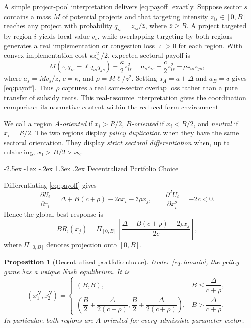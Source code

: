\documentclass[12pt]{article}
\makeatletter
\newtheorem{proposition}{Proposition}
\renewcommand\section{\@startsection{section}{1}{\z@}%
  {-2.5ex \@plus -1ex \@minus -.2ex}%
  {1.3ex \@plus .2ex}%
  {\centering\normalfont\fontsize{14}{16}\selectfont\bfseries}}
\makeatother
\begin{document}
A simple project-pool interpretation delivers \eqref{eq:payoff} exactly. Suppose sector $s$ contains a mass $M$ of potential projects and that targeting intensity $z_{is}\in[0,B]$ reaches any project with probability $q_{is}=z_{is}/\bar z$, where $\bar z\ge B$. A project targeted by region $i$ yields local value $v_s$, while overlapping targeting by both regions generates a real implementation or congestion loss $\ell>0$ for each region. With convex implementation cost $\kappa z_{is}^2/2$, expected sectoral payoff is
\[
M\left(v_s q_{is}-\ell q_{is}q_{js}\right)-\frac{\kappa}{2}z_{is}^2
=a_s z_{is}-\frac{c}{2}z_{is}^2-\rho z_{is}z_{js},
\]
where $a_s=Mv_s/\bar z$, $c=\kappa$, and $\rho=M\ell/\bar z^2$. Setting $a_A=a+\Delta$ and $a_B=a$ gives \eqref{eq:payoff}. Thus $\rho$ captures a real same-sector overlap loss rather than a pure transfer of subsidy rents. This real-resource interpretation gives the coordination comparison its normative content within the reduced-form environment.

We call a region \emph{$A$-oriented} if $x_i>B/2$, \emph{$B$-oriented} if $x_i<B/2$, and \emph{neutral} if $x_i=B/2$. The two regions display \emph{policy duplication} when they have the same sectoral orientation. They display \emph{strict sectoral differentiation} when, up to relabeling, $x_1>B/2>x_2$.

\section{Decentralized Portfolio Choice}

Differentiating \eqref{eq:payoff} gives
\begin{equation}
\frac{\partial U_i}{\partial x_i}
=\Delta+B(c+\rho)-2cx_i-2\rho x_j,
\qquad
\frac{\partial^2 U_i}{\partial x_i^2}=-2c<0.
\label{eq:foc}
\end{equation}
Hence the global best response is
\begin{equation}
BR_i(x_j)=
\Pi_{[0,B]}
\left[
\frac{\Delta+B(c+\rho)-2\rho x_j}{2c}
\right],
\label{eq:br}
\end{equation}
where $\Pi_{[0,B]}$ denotes projection onto $[0,B]$.

\begin{proposition}[Decentralized portfolio choice]
Under \eqref{eq:domain}, the policy game has a unique Nash equilibrium. It is
\begin{equation}
(x_1^N,x_2^N)=
\begin{cases}
(B,B), & B\le \dfrac{\Delta}{c+\rho},\\[6pt]
\left(
\dfrac{B}{2}+\dfrac{\Delta}{2(c+\rho)},
\dfrac{B}{2}+\dfrac{\Delta}{2(c+\rho)}
\right),
& B>\dfrac{\Delta}{c+\rho}.
\end{cases}
\label{eq:ne}
\end{equation}
In particular, both regions are $A$-oriented for every admissible parameter vector.
\end{proposition}
\end{document}
